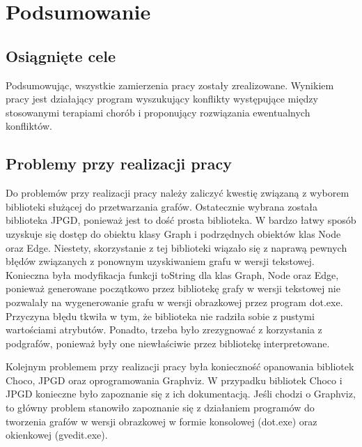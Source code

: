 \chapter{Podsumowanie}

\section{Osiągnięte cele}

Podsumowując, wszystkie zamierzenia pracy zostały zrealizowane. Wynikiem pracy jest działający program wyszukujący konflikty występujące między stosowanymi terapiami chorób i proponujący rozwiązania ewentualnych konfliktów. 

\section{Problemy przy realizacji pracy}
Do problemów przy realizacji pracy należy zaliczyć kwestię związaną z wyborem biblioteki służącej do przetwarzania grafów. Ostatecznie wybrana została biblioteka JPGD, ponieważ jest to dość prosta biblioteka. W bardzo łatwy sposób uzyskuje się dostęp do obiektu klasy Graph i podrzędnych obiektów klas Node oraz Edge. Niestety, skorzystanie z tej biblioteki wiązało się z naprawą pewnych błędów związanych z ponownym uzyskiwaniem grafu w wersji tekstowej. Konieczna była modyfikacja funkcji toString dla klas Graph, Node oraz Edge, ponieważ generowane początkowo przez bibliotekę grafy w wersji tekstowej nie pozwalały na wygenerowanie grafu w wersji obrazkowej przez program dot.exe. Przyczyna błędu tkwiła w tym, że biblioteka nie radziła sobie z pustymi wartościami atrybutów. Ponadto, trzeba było zrezygnować z korzystania z podgrafów, ponieważ były one niewłaściwie przez bibliotekę interpretowane. 

Kolejnym problemem przy realizacji pracy była konieczność opanowania bibliotek Choco, JPGD oraz oprogramowania Graphviz. W przypadku bibliotek Choco i JPGD konieczne było zapoznanie się z ich dokumentacją. Jeśli chodzi o Graphviz, to główny problem stanowiło zapoznanie się z działaniem programów do tworzenia grafów w wersji obrazkowej w formie konsolowej (dot.exe) oraz okienkowej (gvedit.exe).

